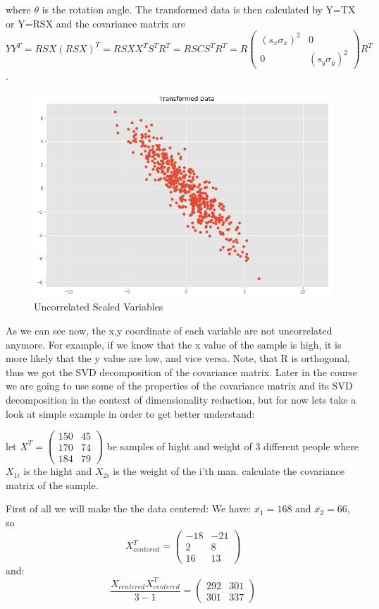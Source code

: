 \documentclass[11pt]{article}
\begin{document}
where $\theta$ is the rotation angle. The transformed data is then calculated by Y=TX or Y=RSX and the covariance matrix are $$YY^T=RSX(RSX)^T=RSXX^TS^TR^T=RSCS^TR^T=R\left( \begin{array}{ccc}  (s_x\sigma_x)^2 & 0 \\  0 & (s_y\sigma_y)^2 \end{array} \right)R^T$$.

\begin{figure}[h!]
  \centering
    \includegraphics[scale=0.3]{correlated.png}  
   \caption{Uncorrelated Scaled Variables}
\end{figure}

As we can see now, the x,y coordinate of each variable are not uncorrelated anymore. For example, if we know that the x value of the sample is high, it is more likely that the y value are low, and vice versa. Note, that R is orthogonal, thus we got the SVD decomposition of the covariance matrix. Later in the course we are going to use some of the properties of the covariance matrix and its SVD decomposition in the context of dimensionality reduction, but for now lets take a look at simple example in order to get better understand:

\begin{exercise}
let $X^T=\left(\begin{array}{cc}
150 & 45\\
170 & 74\\
184 & 79
\end{array}\right)$ be samples of hight and weight of 3 different people where $X_{1i}$ is the hight and $X_{2i}$ is the weight of the i'th man. calculate the covariance matrix of the sample.
\end{exercise}
First of all we will make the the data centered:
We have: $\bar{x_1}=168$ and $\bar{x_2}=66$, so $$X_{centered}^{T}=\left(\begin{array}{cc}
-18 & -21\\
2 & 8\\
16 & 13
\end{array}\right)$$
and: 
$$
\frac{X_{centered}X_{centered}^{T}}{3-1}=\left(\begin{array}{cc}
292 & 301\\
301 & 337
\end{array}\right)
$$
\end{document}
